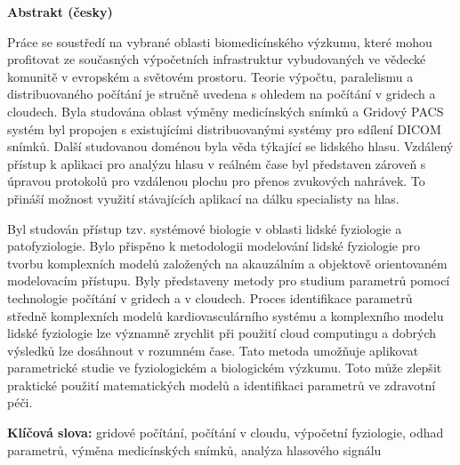 
\newpage
\begin{center}
\Large \textbf{Abstrakt (česky)}
\end{center} 
\normalsize
Práce se soustředí na vybrané oblasti biomedicínského výzkumu, které mohou profitovat ze současných výpočetních infrastruktur vybudovaných ve vědecké komunitě v evropském a světovém prostoru. Teorie výpočtu, paralelismu a distribuovaného počítání je stručně uvedena s ohledem na počítání v gridech a cloudech. Byla studována oblast výměny medicínských snímků a Gridový PACS systém byl propojen s existujícími distribuovanými systémy pro sdílení DICOM snímků. Další studovanou doménou byla věda týkající se lidského hlasu. Vzdálený přístup k aplikaci pro analýzu hlasu v reálném čase byl představen zároveň s úpravou protokolů pro vzdálenou plochu pro přenos zvukových nahrávek. To přináší možnost využití stávajících aplikací na dálku specialisty na hlas. 

Byl studován přístup tzv. systémové biologie v oblasti lidské fyziologie a patofyziologie. Bylo přispěno k metodologii modelování lidské fyziologie pro tvorbu komplexních modelů založených na akauzálním a objektově orientovaném modelovacím přístupu. Byly představeny metody pro studium parametrů pomocí technologie počítání v gridech a v cloudech. Proces identifikace parametrů středně komplexních modelů kardiovasculárního systému a komplexního modelu lidské fyziologie lze významně zrychlit při použití cloud computingu a dobrých výsledků lze dosáhnout v rozumném čase. Tato metoda umožňuje aplikovat parametrické studie ve fyziologickém a biologickém výzkumu. Toto může zlepšit praktické použití matematických modelů a identifikaci parametrů ve zdravotní péči.


\textbf{Klíčová slova:}
gridové počítání, počítání v cloudu, výpočetní fyziologie, odhad parametrů, výměna medicínských snímků, analýza hlasového signálu

